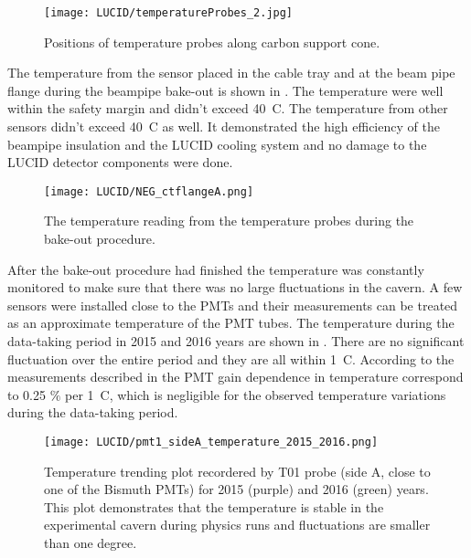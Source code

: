 \begin{figure}
\centering
\texttt{[image: LUCID/temperatureProbes\_2.jpg]}
\caption{Positions of temperature probes along carbon support cone.}
\label{fig:temperatureProbes_VJCone}
\end{figure}

The temperature from the sensor placed in the cable tray and at the beam pipe flange during the beampipe bake-out is shown in .
The temperature were well within the safety margin and didn't exceed 40\degree~C. The temperature from other sensors didn't exceed 40\degree~C as well.
It demonstrated the high efficiency of the beampipe insulation and the LUCID cooling system and no damage to the LUCID detector components were done.

\begin{figure}
\centering
\texttt{[image: LUCID/NEG\_ctflangeA.png]}
\caption{The temperature reading from the temperature probes during the bake-out procedure.}
\label{fig:NEG_ctflangeA}
\end{figure}
 
After the bake-out procedure had finished the temperature was constantly monitored to make sure that there was no large fluctuations in the cavern.
A few sensors were installed close to the PMTs and their measurements can be treated as an approximate temperature of the PMT tubes.
The temperature during the data-taking period in 2015 and 2016 years are shown in . 
There are no significant fluctuation over the entire period and they are all within 1\degree~C.
According to the measurements described in  the PMT gain dependence in temperature correspond
to 0.25 $\%$ per 1\degree~C, which is negligible for the observed temperature variations during the data-taking period.

\begin{figure}
\centering
\texttt{[image: LUCID/pmt1\_sideA\_temperature\_2015\_2016.png]}
\caption{Temperature trending plot recordered by T01 probe (side A, close to one of the Bismuth PMTs)
for 2015 (purple) and 2016 (green) years. This plot demonstrates that the temperature is stable in 
the experimental cavern during physics runs and fluctuations are smaller than one degree.}
\label{fig:tempTrendingPlot}
\end{figure}

